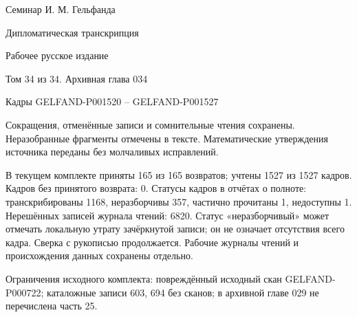 \documentclass[11pt]{article}
\theoremstyle{definition}
\theoremstyle{remark}
\begin{document}
\begin{center}
{\Large Семинар И. М. Гельфанда}\par\medskip
{\LARGE Дипломатическая транскрипция}\par\bigskip
{\large Рабочее русское издание}\par\medskip
{\large Том 34 из 34. Архивная глава 034}\par\bigskip
Кадры GELFAND-P001520 -- GELFAND-P001527\par
\end{center}
\medskip
Сокращения, отменённые записи и сомнительные чтения сохранены.
Неразобранные фрагменты отмечены в тексте. Математические утверждения
источника переданы без молчаливых исправлений.

В текущем комплекте приняты 165 из 165 возвратов; учтены 1527 из 1527 кадров. Кадров без принятого возврата: 0.
Статусы кадров в отчётах о полноте: транскрибированы 1168, неразборчивы 357, частично прочитаны 1, недоступны 1.
Нерешённых записей журнала чтений: 6820.
Статус «неразборчивый» может отмечать локальную утрату зачёркнутой записи;
он не означает отсутствия всего кадра.
Сверка с рукописью продолжается. Рабочие журналы чтений и происхождения
данных сохранены отдельно.

Ограничения исходного комплекта: повреждённый исходный скан GELFAND-P000722; каталожные записи 603, 694 без сканов; в архивной главе 029 не перечислена часть 25.
\end{document}
